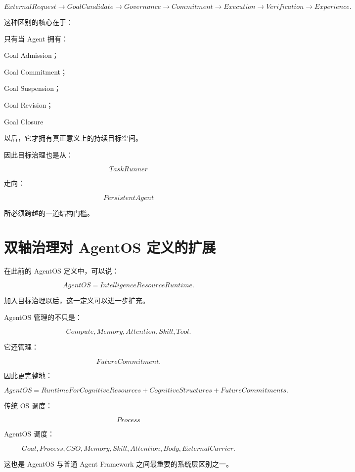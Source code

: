 \[
ExternalRequest
\rightarrow
GoalCandidate
\rightarrow
Governance
\rightarrow
Commitment
\rightarrow
Execution
\rightarrow
Verification
\rightarrow
Experience.
\]

这种区别的核心在于：

\begin{statementbox}
\centering
{}
\end{statementbox}

只有当 Agent 拥有：

Goal Admission；

Goal Commitment；

Goal Suspension；

Goal Revision；

Goal Closure

以后，它才拥有真正意义上的持续目标空间。

因此目标治理也是从：

\[
\boxed{
TaskRunner
}
\]

走向：

\[
\boxed{
PersistentAgent
}
\]

所必须跨越的一道结构门槛。


\section{双轴治理对 AgentOS 定义的扩展}

在此前的 AgentOS 定义中，可以说：

\[
\boxed{
AgentOS
=
IntelligenceResourceRuntime.
}
\]

加入目标治理以后，这一定义可以进一步扩充。

AgentOS 管理的不只是：

\[
Compute,
Memory,
Attention,
Skill,
Tool.
\]

它还管理：

\[
\boxed{
FutureCommitment.
}
\]

因此更完整地：

\[
\boxed{
AgentOS
=
RuntimeFor
CognitiveResources
+
CognitiveStructures
+
FutureCommitments.
}
\]

传统 OS 调度：

\[
Process
\]

AgentOS 调度：

\[
Goal,
Process,
CSO,
Memory,
Skill,
Attention,
Body,
ExternalCarrier.
\]

这也是 AgentOS 与普通 Agent Framework 之间最重要的系统层区别之一。


